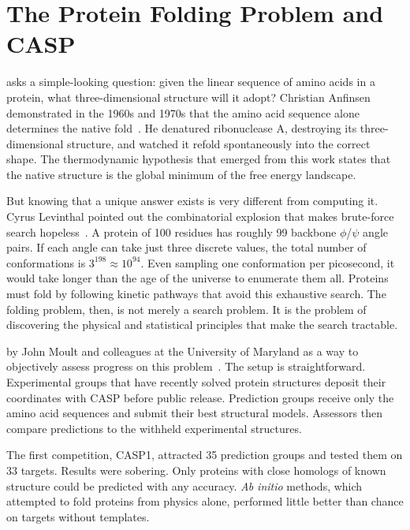 \section{The Protein Folding Problem and CASP}
\label{sec:af2-folding-problem}

 asks a simple-looking question: given the linear sequence of amino acids in a protein, what three-dimensional structure will it adopt?
Christian Anfinsen demonstrated in the 1960s and 1970s that the amino acid sequence alone determines the native fold~\cite{anfinsen1973}.
He denatured ribonuclease A, destroying its three-dimensional structure, and watched it refold spontaneously into the correct shape.
The thermodynamic hypothesis that emerged from this work states that the native structure is the global minimum of the free energy landscape.

But knowing that a unique answer exists is very different from computing it.
Cyrus Levinthal pointed out the combinatorial explosion that makes brute-force search hopeless~\cite{levinthal1969}.
A protein of 100 residues has roughly 99 backbone $\phi$/$\psi$ angle pairs.
If each angle can take just three discrete values, the total number of conformations is $3^{198} \approx 10^{94}$.
Even sampling one conformation per picosecond, it would take longer than the age of the universe to enumerate them all.
Proteins must fold by following kinetic pathways that avoid this exhaustive search.
The folding problem, then, is not merely a search problem.  It is the problem of discovering the physical and statistical principles that make the search tractable.

 by John Moult and colleagues at the University of Maryland as a way to objectively assess progress on this problem~\cite{moult1995}.
The setup is straightforward.
Experimental groups that have recently solved protein structures deposit their coordinates with CASP before public release.
Prediction groups receive only the amino acid sequences and submit their best structural models.
Assessors then compare predictions to the withheld experimental structures.

The first competition, CASP1, attracted 35 prediction groups and tested them on 33 targets.
Results were sobering.
Only proteins with close homologs of known structure could be predicted with any accuracy.
\emph{Ab initio} methods, which attempted to fold proteins from physics alone, performed little better than chance on targets without templates.

